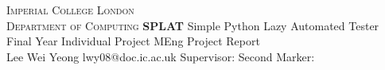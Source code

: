 \begin{titlepage}
\begin{center}
\textsc{\Large Imperial College London\\Department of Computing}
\vfil
{\Huge{\textbf{SPLAT}}}\linebreak \linebreak
{\huge Simple Python Lazy Automated Tester}
\vfil
{\LARGE Final Year Individual Project}\linebreak \linebreak
{\LARGE MEng Project Report}\\[2cm]
\vfil
{\Large Lee Wei Yeong} \linebreak \linebreak
{\Large \textsf{lwy08@doc.ic.ac.uk}}
\vfil
{\Large Supervisor: \supervisor} \linebreak \linebreak
{\Large Second Marker: \secondmarker}
\vfil
{\Large \monthname\ \number\year}
\end{center}
\end{titlepage}
